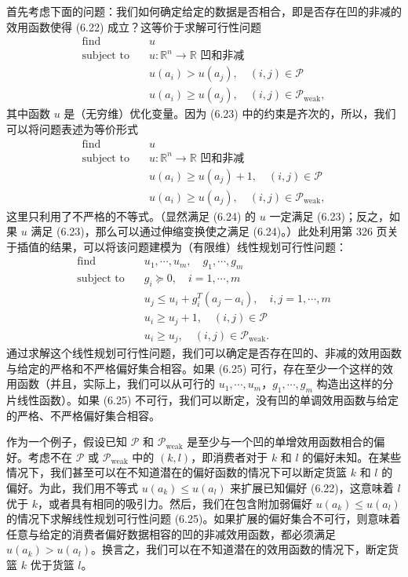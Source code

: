 \documentclass[UTF8, 12pt, fontset=fandol, oneside]{ctexart}
\begin{document}
首先考虑下面的问题：我们如何确定给定的数据是否相合，即是否存在凹的非减的效用函数使得 (6.22) 成立？这等价于求解可行性问题
\begin{equation}
\begin{aligned}
\text{find}\quad & u\\
\text{subject to}\quad & u:\mathbb{R}^n\to\mathbb{R}\text{ 凹和非减}\\
& u(a_i)>u(a_j),\quad (i,j)\in\mathcal{P}\\
& u(a_i)\geq u(a_j),\quad (i,j)\in\mathcal{P}_{\mathrm{weak}},
\end{aligned}
\tag{6.23}
\end{equation}
其中函数 $u$ 是（无穷维）优化变量。因为 (6.23) 中的约束是齐次的，所以，我们可以将问题表述为等价形式
\begin{equation}
\begin{aligned}
\text{find}\quad & u\\
\text{subject to}\quad & u:\mathbb{R}^n\to\mathbb{R}\text{ 凹和非减}\\
& u(a_i)\geq u(a_j)+1,\quad (i,j)\in\mathcal{P}\\
& u(a_i)\geq u(a_j),\quad (i,j)\in\mathcal{P}_{\mathrm{weak}},
\end{aligned}
\tag{6.24}
\end{equation}
这里只利用了不严格的不等式。（显然满足 (6.24) 的 $u$ 一定满足 (6.23)；反之，如果 $u$ 满足 (6.23)，那么可以通过伸缩变换使之满足 (6.24)。）此处利用第 326 页关于插值的结果，可以将该问题建模为（有限维）线性规划可行性问题：
\begin{equation}
\begin{aligned}
\text{find}\quad & u_1,\cdots,u_m,\quad g_1,\cdots,g_m\\
\text{subject to}\quad & g_i\succeq 0,\quad i=1,\cdots,m\\
& u_j\leq u_i+g_i^T(a_j-a_i),\quad i,j=1,\cdots,m\\
& u_i\geq u_j+1,\quad (i,j)\in\mathcal{P}\\
& u_i\geq u_j,\quad (i,j)\in\mathcal{P}_{\mathrm{weak}}.
\end{aligned}
\tag{6.25}
\end{equation}
通过求解这个线性规划可行性问题，我们可以确定是否存在凹的、非减的效用函数与给定的严格和不严格偏好集合相容。如果 (6.25) 可行，存在至少一个这样的效用函数（并且，实际上，我们可以从可行的 $u_1,\cdots,u_m$，$g_1,\cdots,g_m$ 构造出这样的分片线性函数）。如果 (6.25) 不可行，我们可以断定，没有凹的单调效用函数与给定的严格、不严格偏好集合相容。

作为一个例子，假设已知 $\mathcal{P}$ 和 $\mathcal{P}_{\mathrm{weak}}$ 是至少与一个凹的单增效用函数相合的偏好。考虑不在 $\mathcal{P}$ 或 $\mathcal{P}_{\mathrm{weak}}$ 中的 $(k,l)$，即消费者对于 $k$ 和 $l$ 的偏好未知。在某些情况下，我们甚至可以在不知道潜在的偏好函数的情况下可以断定货篮 $k$ 和 $l$ 的偏好。为此，我们用不等式 $u(a_k)\leq u(a_l)$ 来扩展已知偏好 (6.22)，这意味着 $l$ 优于 $k$，或者具有相同的吸引力。然后，我们在包含附加弱偏好 $u(a_k)\leq u(a_l)$ 的情况下求解线性规划可行性问题 (6.25)。如果扩展的偏好集合不可行，则意味着任意与给定的消费者偏好数据相容的凹的非减效用函数，都必须满足 $u(a_k)>u(a_l)$。换言之，我们可以在不知道潜在的效用函数的情况下，断定货篮 $k$ 优于货篮 $l$。
\end{document}
